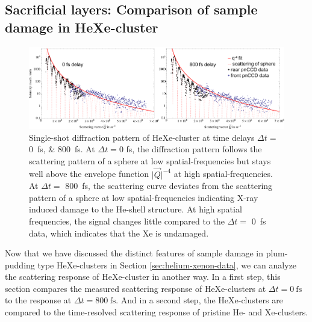 \subsection{Sacrificial layers: Comparison of sample damage in HeXe-cluster}\label{sec:comparison-of-He-and-HeXe-clusters}
%
\begin{figure}
	\centering
		\includegraphics[width=1.00\textwidth]{images/results/HeXe-comparison-0-800-fs.png}
	\caption[Single-shot diffraction patterns of HeXe-cluster at different time delays]{Single-shot diffraction pattern of HeXe-cluster at time delays $\Delta t =$ 
	\SIlist{0;800}{\femto\second}. At $\Delta t=0$ fs, the diffraction pattern follows the scattering pattern of a sphere at low spatial-frequencies but stays well above the envelope function $\lvert\vec{Q}\rvert^{-4}$ at high spatial-frequencies. At $\Delta t=$ \SI{800}{\femto\second}, the scattering curve deviates from the scattering pattern of a sphere at low spatial-frequencies indicating X-ray induced damage to the He-shell structure. At high spatial frequencies, the signal changes little compared to the $\Delta t=$ \SI{0}{\femto\second} data, which indicates that the Xe is undamaged.
	}
	\label{fig:HeXe-comparison-0-800-fs}
\end{figure}
%
Now that we have discussed the distinct features of sample damage in plum-pudding type HeXe-clusters in Section \ref{sec:helium-xenon-data}, we can analyze the scattering response of HeXe-cluster in another way. In a first step, this section compares the measured scattering response of HeXe-clusters at $\Delta t=\SI{0}{\femto\second}$ to the response at  $\Delta t=\SI{800}{\femto\second}$. And in a second step, the HeXe-clusters are compared to the time-resolved scattering response of pristine He- and Xe-clusters.\\[1\baselineskip]
